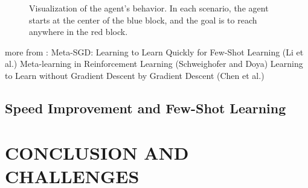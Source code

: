 \documentclass[letterpaper, 10 pt, conference]{ieeeconf}  %
\begin{document}
\begin{figure}[thpb]
        \centering
  \caption{Visualization of the agent’s behavior. In each scenario, the agent starts at the center of the
  blue block, and the goal is to reach anywhere in the red block.  
  }
        \label{figurelabel}
     \end{figure}

more from :  \newline
Meta-SGD: Learning to Learn Quickly for Few-Shot Learning (Li et al.) \newline
Meta-learning in Reinforcement Learning (Schweighofer and Doya) \newline
Learning to Learn without Gradient Descent by Gradient Descent (Chen et al.)

\subsection{Speed Improvement and Few-Shot Learning}

\section{CONCLUSION AND CHALLENGES}

\addtolength{\textheight}{-12cm}   %

\end{document}
